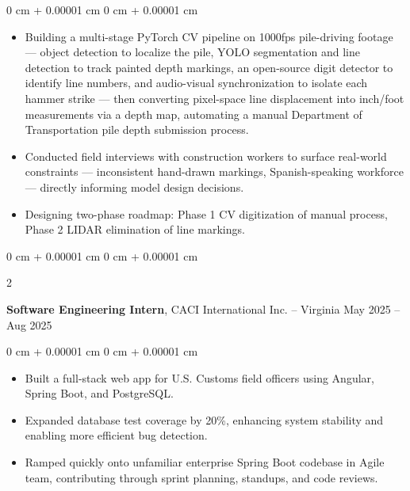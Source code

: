 \documentclass[10pt, letterpaper]{article}
\newenvironment{highlights}{
    \begin{itemize}[
        topsep=0.3 cm,
        parsep=0.05 cm,
        partopsep=0pt,
        itemsep=0pt,
        leftmargin=0 cm + 10pt
    ]
}{
    \end{itemize}
} %
\newenvironment{onecolentry}{
    \begin{adjustwidth}{
        0 cm + 0.00001 cm
    }{
        0 cm + 0.00001 cm
    }
}{
    \end{adjustwidth}
} %
\newenvironment{twocolentry}[2][]{
    \onecolentry
    \def\secondColumn{#2}
    \setcolumnwidth{\fill, 4.5 cm}
    \begin{paracol}{2}
}{
    \switchcolumn \raggedleft \secondColumn
    \end{paracol}
    \endonecolentry
} %
\begin{document}
        \vspace{0.07 cm}
        \begin{onecolentry}
            \begin{highlights}
                \item Building a multi-stage PyTorch CV pipeline on 1000fps pile-driving footage — object detection to localize the pile, YOLO segmentation and line detection to track painted depth markings, an open-source digit detector to identify line numbers, and audio-visual synchronization to isolate each hammer strike — then converting pixel-space line displacement into inch/foot measurements via a depth map, automating a manual Department of Transportation pile depth submission process.
                \item Conducted field interviews with construction workers to surface real-world constraints — inconsistent hand-drawn markings, Spanish-speaking workforce — directly informing model design decisions.
                \item Designing two-phase roadmap: Phase 1 CV digitization of manual process, Phase 2 LIDAR elimination of line markings.
            \end{highlights}
        \end{onecolentry}

        \vspace{0.07 cm}

        \begin{twocolentry}{
            May 2025 – Aug 2025
        }
            \textbf{Software Engineering Intern}, CACI International Inc. -- Virginia\end{twocolentry}

        \vspace{0.07 cm}
        \begin{onecolentry}
            \begin{highlights}
                \item Built a full-stack web app for U.S. Customs field officers using Angular, Spring Boot, and PostgreSQL.
                \item Expanded database test coverage by 20\%, enhancing system stability and enabling more efficient bug detection.
                \item Ramped quickly onto unfamiliar enterprise Spring Boot codebase in Agile team, contributing through sprint planning, standups, and code reviews.
            \end{highlights}
        \end{onecolentry}
\end{document}
